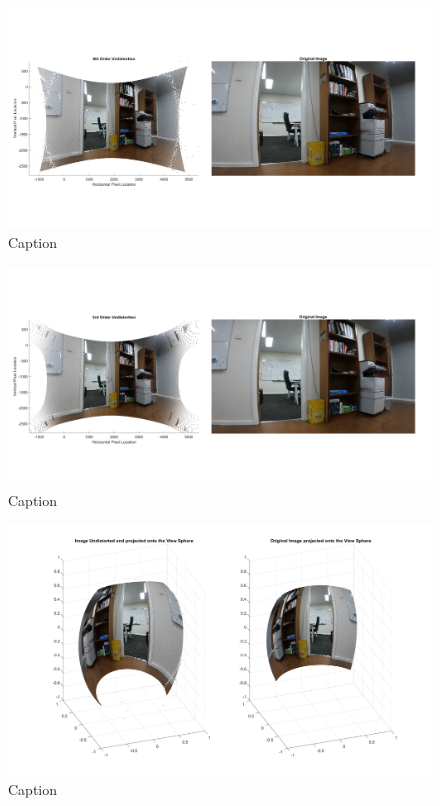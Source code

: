 \documentclass{UoNMCHA}
\numberwithin{equation}{section}
\begin{document}
\begin{figure}[ht]
    \begin{center}
        \includegraphics[width=.8\linewidth]{Figures/Matlab/6rdOrderUndistort}
        \caption{Caption}
        \label{fig:6rdOrderUndistort}
    \end{center}
\end{figure}
\begin{figure}[ht]
    \begin{center}
        \includegraphics[width=.8\linewidth]{Figures/Matlab/3rdOrderUndistort}
        \caption{Caption}
        \label{fig:3rdOrderUndistort}
    \end{center}
\end{figure}
\begin{figure}[ht]
    \begin{center}
        \includegraphics[width=.8\linewidth]{Figures/Matlab/Image_on_ViewSphere}
        \caption{Caption}
        \label{fig:Image_on_ViewSphere}
    \end{center}
\end{figure}
\end{document}
